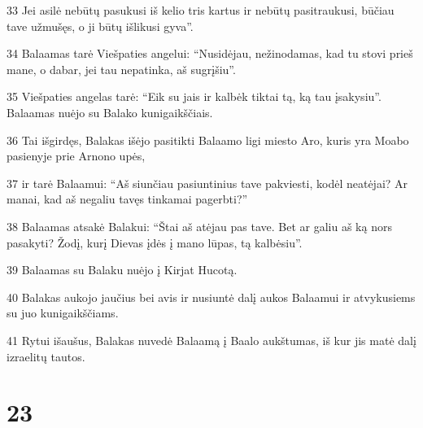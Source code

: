 \par 33 Jei asilė nebūtų pasukusi iš kelio tris kartus ir nebūtų pasitraukusi, būčiau tave užmušęs, o ji būtų išlikusi gyva”. 
\par 34 Balaamas tarė Viešpaties angelui: “Nusidėjau, nežinodamas, kad tu stovi prieš mane, o dabar, jei tau nepatinka, aš sugrįšiu”. 
\par 35 Viešpaties angelas tarė: “Eik su jais ir kalbėk tiktai tą, ką tau įsakysiu”. Balaamas nuėjo su Balako kunigaikščiais. 
\par 36 Tai išgirdęs, Balakas išėjo pasitikti Balaamo ligi miesto Aro, kuris yra Moabo pasienyje prie Arnono upės, 
\par 37 ir tarė Balaamui: “Aš siunčiau pasiuntinius tave pakviesti, kodėl neatėjai? Ar manai, kad aš negaliu tavęs tinkamai pagerbti?” 
\par 38 Balaamas atsakė Balakui: “Štai aš atėjau pas tave. Bet ar galiu aš ką nors pasakyti? Žodį, kurį Dievas įdės į mano lūpas, tą kalbėsiu”. 
\par 39 Balaamas su Balaku nuėjo į Kirjat Hucotą. 
\par 40 Balakas aukojo jaučius bei avis ir nusiuntė dalį aukos Balaamui ir atvykusiems su juo kunigaikščiams. 
\par 41 Rytui išaušus, Balakas nuvedė Balaamą į Baalo aukštumas, iš kur jis matė dalį izraelitų tautos.



\chapter{23}

